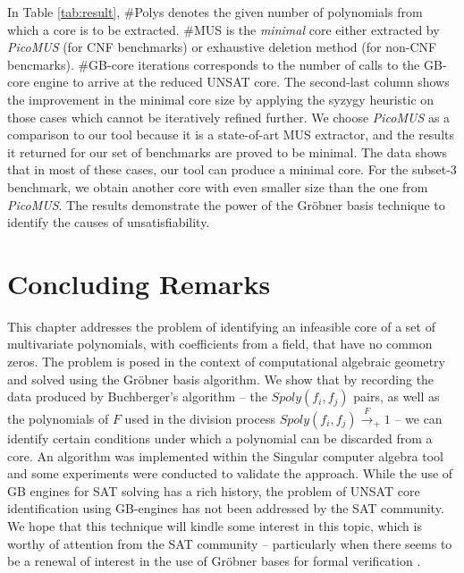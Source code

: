 In Table \ref{tab:result}, 
\#Polys denotes the given number of polynomials
from which a core is to be extracted. \#MUS is the {\it minimal} core either
extracted by {\it PicoMUS} (for CNF benchmarks) or exhaustive deletion method (for non-CNF bencmarks).
 \#GB-core iterations corresponds to the
number of calls to the GB-core engine to arrive at the reduced UNSAT
core. The second-last column shows the improvement in the minimal core
size by applying the syzygy heuristic on those cases which cannot be
iteratively refined further. 
We choose {\it PicoMUS} as a comparison to our tool because it is a state-of-art MUS extractor,
and the results it returned for our set of benchmarks are proved to be minimal. 
The data shows that in most of these
cases, our tool can produce a minimal core. For the subset-3
benchmark, we obtain another core with even smaller size than the one from {\it PicoMUS}. The results
demonstrate the power of the Gr\"obner basis technique to identify the
causes of unsatisfiability. 



\section{Concluding Remarks}\label{sec:conc}
This chapter addresses the problem of identifying an infeasible core of
a set of multivariate polynomials, with coefficients from a field,
that have no common zeros. The problem is posed in the context of
computational algebraic geometry and solved using the Gr\"obner basis
algorithm. We show that by recording the data produced by
Buchberger's algorithm -- the $Spoly(f_i,f_j)$ pairs, as well as the
polynomials of $F$ used in the division process
$Spoly(f_i,f_j)\xrightarrow{F}_+ 1$ -- we can identify certain
conditions under which a polynomial can be discarded from a core. An
algorithm was implemented within the Singular computer algebra tool
and some experiments were conducted to validate the approach. While
the use of GB engines for SAT solving has a rich history, the problem
of UNSAT core identification using GB-engines has not been addressed
by the SAT community. We hope that this technique will kindle some
interest in this topic, which is worthy of attention from the SAT
community -- particularly when there seems to be a renewal of interest
in the use of Gr\"obner bases for formal verification
\cite{lv:tcad2013,gao:qe-gf-gb,kalla:fmcad_tut2015,rolf:date16}.    
